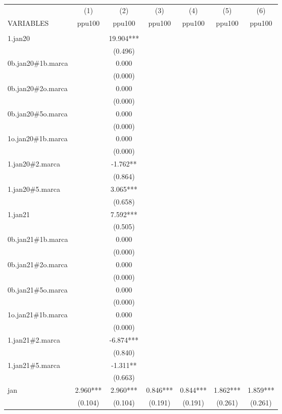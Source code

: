 \begin{tabular}{lcccccc} \hline
 & (1) & (2) & (3) & (4) & (5) & (6) \\
VARIABLES & ppu100 & ppu100 & ppu100 & ppu100 & ppu100 & ppu100 \\ \hline
 &  &  &  &  &  &  \\
1.jan20 &  & 19.904*** &  &  &  &  \\
 &  & (0.496) &  &  &  &  \\
0b.jan20\#1b.marca &  & 0.000 &  &  &  &  \\
 &  & (0.000) &  &  &  &  \\
0b.jan20\#2o.marca &  & 0.000 &  &  &  &  \\
 &  & (0.000) &  &  &  &  \\
0b.jan20\#5o.marca &  & 0.000 &  &  &  &  \\
 &  & (0.000) &  &  &  &  \\
1o.jan20\#1b.marca &  & 0.000 &  &  &  &  \\
 &  & (0.000) &  &  &  &  \\
1.jan20\#2.marca &  & -1.762** &  &  &  &  \\
 &  & (0.864) &  &  &  &  \\
1.jan20\#5.marca &  & 3.065*** &  &  &  &  \\
 &  & (0.658) &  &  &  &  \\
1.jan21 &  & 7.592*** &  &  &  &  \\
 &  & (0.505) &  &  &  &  \\
0b.jan21\#1b.marca &  & 0.000 &  &  &  &  \\
 &  & (0.000) &  &  &  &  \\
0b.jan21\#2o.marca &  & 0.000 &  &  &  &  \\
 &  & (0.000) &  &  &  &  \\
0b.jan21\#5o.marca &  & 0.000 &  &  &  &  \\
 &  & (0.000) &  &  &  &  \\
1o.jan21\#1b.marca &  & 0.000 &  &  &  &  \\
 &  & (0.000) &  &  &  &  \\
1.jan21\#2.marca &  & -6.874*** &  &  &  &  \\
 &  & (0.840) &  &  &  &  \\
1.jan21\#5.marca &  & -1.311** &  &  &  &  \\
 &  & (0.663) &  &  &  &  \\
jan & 2.960*** & 2.960*** & 0.846*** & 0.844*** & 1.862*** & 1.859*** \\
 & (0.104) & (0.104) & (0.191) & (0.191) & (0.261) & (0.261) \\

\end{tabular}
